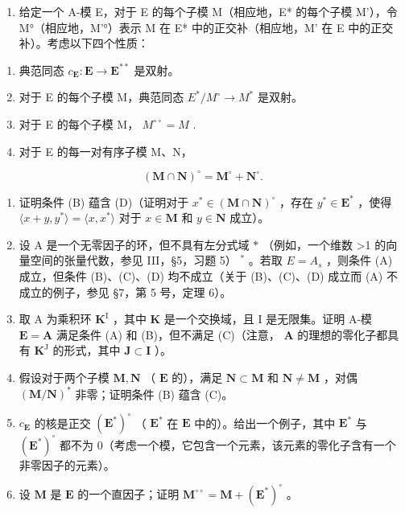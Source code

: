 \begin{enumerate}
\def\labelenumi{\arabic{enumi}.}
\setcounter{enumi}{8}
\tightlist
\item
  给定一个 A-模 E，对于 E 的每个子模 M（相应地，E* 的每个子模 M'），令 M°（相应地，M'°）表示 M 在 E* 中的正交补（相应地，M' 在 E 中的正交补）。考虑以下四个性质：
\end{enumerate}

\begin{enumerate}
\def\labelenumi{(\Alph{enumi})}
\item
  典范同态 \(c_{\mathbf{E}}: \mathbf{E} \to \mathbf{E}^{**}\) 是双射。
\item
  对于 E 的每个子模 M，典范同态 \(E^{*}/M^{\circ} \rightarrow M^{*}\) 是双射。
\item
  对于 E 的每个子模 M， \(M^{\circ\circ} = M\) .
\item
  对于 E 的每一对有序子模 M、N，
\end{enumerate}

\[
(\mathbf {M} \cap \mathbf {N}) ^ {\circ} = \mathbf {M} ^ {\circ} + \mathbf {N} ^ {\circ}.
\]

\begin{enumerate}
\def\labelenumi{(\alph{enumi})}
\item
  证明条件 (B) 蕴含 (D)（证明对于 \(x^{*} \in (\mathbf{M} \cap \mathbf{N})^{\circ}\) ，存在 \(y^{*} \in \mathbf{E}^{*}\) ，使得 \(\langle x + y, y^{*} \rangle = \langle x, x^{*} \rangle\) 对于 \(x \in \mathbf{M}\) 和 \(y \in \mathbf{N}\) 成立）。
\item
  设 A 是一个无零因子的环，但不具有左分式域 \(*\) （例如，一个维数 \textgreater1 的向量空间的张量代数，参见 III，§5，习题 5） \(^{*}\) 。若取 \(E = A_{s}\) ，则条件 (A) 成立，但条件 (B)、(C)、(D) 均不成立（关于 (B)、(C)、(D) 成立而 (A) 不成立的例子，参见 §7，第 5 号，定理 6）。
\item
  取 A 为乘积环 \(\mathbf{K}^{\mathrm{I}}\) ，其中 \(\mathbf{K}\) 是一个交换域，且 I 是无限集。证明 A-模 \(\mathbf{E} = \mathbf{A}\) 满足条件 (A) 和 (B)，但不满足 (C)（注意， \(\mathbf{A}\) 的理想的零化子都具有 \(\mathbf{K}^{\mathrm{J}}\) 的形式，其中 \(\mathbf{J} \subset \mathbf{I}\) ）。
\item
  假设对于两个子模 \(\mathbf{M},\mathbf{N}\) （ \(\mathbf{E}\) 的），满足 \(\mathbf{N} \subset \mathbf{M}\) 和 \(\mathbf{N} \neq \mathbf{M}\) ，对偶 \((\mathbf{M} / \mathbf{N})^*\) 非零；证明条件 (B) 蕴含 (C)。
\item
  \(c_{\mathbf{E}}\) 的核是正交 \((\mathbf{E}^{*})^{\circ}\) （ \(\mathbf{E}^{*}\) 在 \(\mathbf{E}\) 中的）。给出一个例子，其中 \(\mathbf{E}^{*}\) 与 \((\mathbf{E}^{*})^{\circ}\) 都不为 0（考虑一个模，它包含一个元素，该元素的零化子含有一个非零因子的元素）。
\item
  设 \(\mathbf{M}\) 是 \(\mathbf{E}\) 的一个直因子；证明 \(\mathbf{M}^{\circ \circ} = \mathbf{M} + (\mathbf{E}^{*})^{\circ}\) 。
\end{enumerate}

